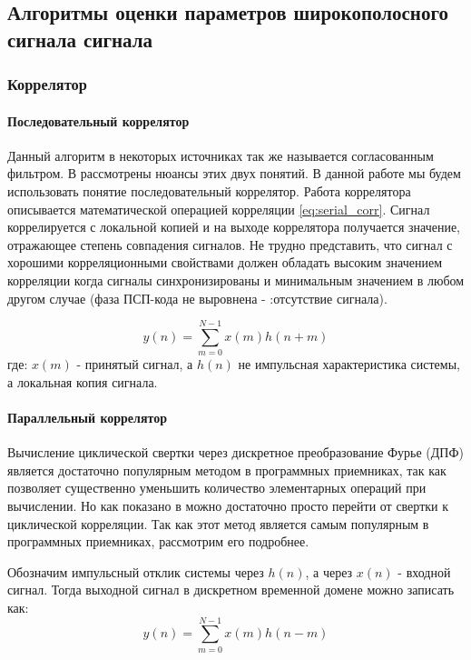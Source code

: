\subsection{Алгоритмы оценки параметров широкополосного сигнала сигнала}

\subsubsection{Коррелятор}

\paragraph{Последовательный коррелятор}
\label{sec1_serial}
Данный алгоритм в некоторых источниках так же называется согласованным фильтром. В \cite{sklyar} рассмотрены нюансы этих двух понятий.
В данной работе мы будем использовать понятие последовательный коррелятор. Работа коррелятора описывается математической операцией
корреляции \ref{eq:serial_corr}. Сигнал коррелируется с локальной копией и на выходе коррелятора получается значение, отражающее
степень совпадения сигналов. Не трудно представить, что сигнал с хорошими корреляционными свойствами должен обладать высоким значением
корреляции когда сигналы синхронизированы и минимальным значением в любом другом случае (фаза ПСП-кода не выровнена - :отсутствие сигнала).

\begin{equation}
	\label{eq:serial_corr}
	y(n)=\sum\limits_{m=0}^{N-1}{x(m)h(n+m)}
\end{equation}
где: ${x(m)}$ - принятый сигнал, а ${h(n)}$ не импульсная характеристика системы, а локальная копия сигнала.

\paragraph{Параллельный коррелятор}
\label{sec1_fft}
Вычисление циклической свертки через дискретное преобразование Фурье (ДПФ) является достаточно популярным методом
в программных приемниках, так как позволяет существенно 
уменьшить количество элементарных операций при вычислении. Но как показано в \cite{tsui, oppenheim} можно достаточно просто
перейти от свертки к циклической корреляции. Так как этот метод является самым популярным в программных приемниках, рассмотрим его
подробнее.

Обозначим импульсный отклик системы через $h(n)$, а через ${x(n)}$ - входной сигнал. Тогда выходной сигнал в дискретном
временной домене можно записать как:
\begin{equation}
	\label{eq:fft_conv}
	y(n)=\sum\limits_{m=0}^{N-1}{x(m)h(n-m)}
\end{equation}

